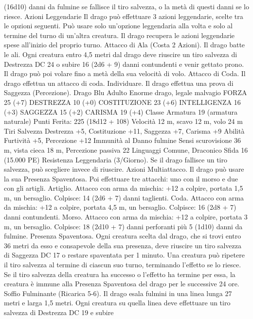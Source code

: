 \begin{multicols}{2}
(16d10) danni da fulmine se fallisce il tiro salvezza, o la metà di
questi danni se lo riesce.
Azioni Leggendarie
Il drago può effettuare 3 azioni leggendarie, scelte tra le opzioni
seguenti. Può usare solo un’opzione leggendaria alla volta e solo
al termine del turno di un’altra creatura. Il drago recupera le
azioni leggendarie spese all’inizio del proprio turno.
Attacco di Ala (Costa 2 Azioni). Il drago batte le ali. Ogni
creatura entro 4,5 metri dal drago deve riuscire un tiro salvezza
di Destrezza DC 24 o subire 16 (2d6 + 9) danni contundenti e
venir gettato prono. Il drago può poi volare fino a metà della sua
velocità di volo.
Attacco di Coda. Il drago effettua un attacco di coda.
Individuare. Il drago effettua una prova di Saggezza
(Percezione).
Drago Blu Adulto
Enorme drago, legale malvagio
FORZA 25 (+7)
DESTREZZA 10 (+0)
COSTITUZIONE 23 (+6)
INTELLIGENZA 16 (+3)
SAGGEZZA 15 (+2)
CARISMA 19 (+4)
Classe Armatura 19 (armatura naturale)
\hspace*{0pt}\hfill{Punti Ferita}: 225 (18d12 + 108)
Velocità 12 m, scavo 12 m, volo 24 m
Tiri Salvezza Destrezza +5, Costituzione +11, Saggezza +7,
Carisma +9
Abilità Furtività +5, Percezione +12
Immunità al Danno fulmine
Sensi scurovisione 36 m, vista cieca 18 m, Percezione passiva 22
Linguaggi Comune, Draconico
Sfida 16 (15.000 PE)
Resistenza Leggendaria (3/Giorno). Se il drago fallisce un tiro
salvezza, può scegliere invece di riuscire.
Azioni
Multiattacco. Il drago può usare la sua Presenza Spaventosa. Poi
effettuare tre attacchi: uno con il morso e due con gli artigli.
Artiglio. Attacco con arma da mischia: +12 a colpire, portata 1,5
m, un bersaglio.
Colpisce: 14 (2d6 + 7) danni taglienti.
Coda. Attacco con arma da mischia: +12 a colpire, portata 4,5
m, un bersaglio.
Colpisce: 16 (2d8 + 7) danni contundenti.
Morso. Attacco con arma da mischia: +12 a colpire, portata 3 m,
un bersaglio.
Colpisce: 18 (2d10 + 7) danni perforanti più 5 (1d10) danni da
fulmine.
Presenza Spaventosa. Ogni creatura scelta dal drago, che si trovi
entro 36 metri da esso e consapevole della sua presenza, deve
riuscire un tiro salvezza di Saggezza DC 17 o restare spaventata
per 1 minuto. Una creatura può ripetere il tiro salvezza al termine
di ciascun suo turno, terminando l’effetto se lo riesce. Se il tiro
salvezza della creatura ha successo o l’effetto ha termine per
essa, la creatura è immune alla Presenza Spaventosa del drago
per le successive 24 ore.
Soffio Fulminante (Ricarica 5-6). Il drago esala fulmini in una
linea lunga 27 metri e larga 1,5 metri. Ogni creatura su quella
linea deve effettuare un tiro salvezza di Destrezza DC 19 e subire

\end{multicols}
